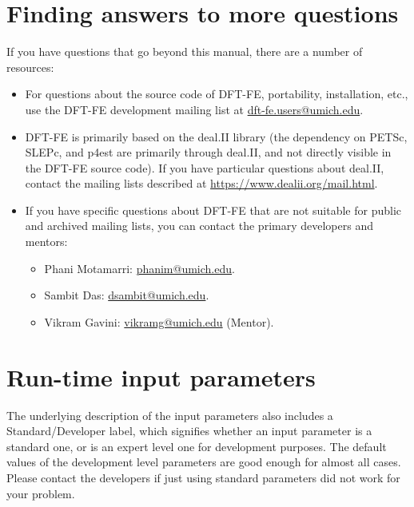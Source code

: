 \documentclass{article}
\newcommand{\dftfe}{\textsc{DFT-FE}}
\begin{document}
\section{Finding answers to more questions}
\label{sec:questions-and-answers}
If you have questions that go beyond this manual, there are a number of
resources:
\begin{itemize}
\item For questions about the source code of \dftfe{}, portability, installation,
  etc., use the \dftfe{} development mailing list at
  \url{dft-fe.users@umich.edu}.

\item \dftfe{} is primarily based on the deal.II library (the dependency
  on PETSc, SLEPc, and p4est are primarily through deal.II, and not directly
  visible in the \dftfe{} source code). If you have particular questions
  about deal.II, contact
  the mailing lists described at \url{https://www.dealii.org/mail.html}.

\item If you have specific questions about \dftfe{} that are not suitable
  for public and archived mailing lists, you can contact the
  primary developers and mentors:
  \begin{itemize}
  \item Phani Motamarri: \url{phanim@umich.edu}.
  \item Sambit Das: \url{dsambit@umich.edu}.
  \item Vikram Gavini: \url{vikramg@umich.edu} (Mentor).
  \end{itemize}
\end{itemize}


\appendix

\section{Run-time input parameters}
\label{sec:parameters}
The underlying description of the input parameters also includes a Standard/Developer label, which signifies whether an input parameter is
a standard one, or is an expert level one for development purposes. The default values of the development level parameters are good enough
for almost all cases. Please contact the developers if just using standard parameters did not work for your problem.  



\pagebreak

\end{document}
